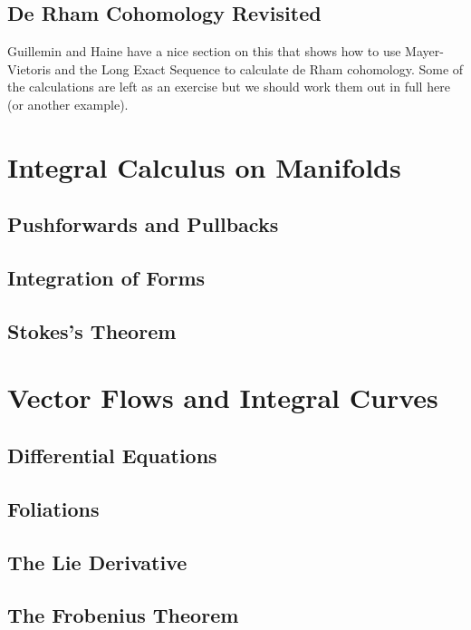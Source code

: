 \documentclass[oneside,english]{amsbook}
\numberwithin{section}{chapter}
\theoremstyle{plain}
\theoremstyle{definition}
\begin{document}
		\section{De Rham Cohomology Revisited}
		
			Guillemin and Haine have a nice section on this that shows how to use Mayer-Vietoris and the Long Exact Sequence to calculate de Rham cohomology. Some of the calculations are left as an exercise but we should work them out in full here (or another example).


	\chapter{Integral Calculus on Manifolds}

		\section{Pushforwards and Pullbacks}
		\section{Integration of Forms}
		\section{Stokes's Theorem}


	\chapter{Vector Flows and Integral Curves}
	
		\section{Differential Equations}

		\section{Foliations}

		\section{The Lie Derivative}
	
		\section{The Frobenius Theorem}
\end{document}
